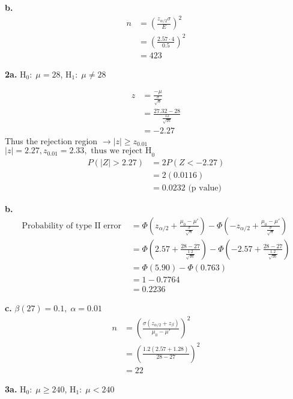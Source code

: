 \documentclass[12pt]{report}
\makeatletter
\newcommand*{\xbar}{}%
\DeclareRobustCommand*{\xbar}{%
	\mathpalette\@xbar{}%
}
\newcommand*{\@xbar}[2]{%
	\sbox0{$#1\mathrm{x}\m@th$}%
	\sbox2{$#1x\m@th$}%
	\rlap{%
		\hbox to\wd2{%
			\hfill
			$\overline{%
				\vrule width 0pt height\ht0 %
				\kern\wd0 %
			}$%
		}%
	}%
	\copy2 %
}
\makeatother
\begin{document}
\noindent \textbf{b.} 
\begin{align*}
	n &= \left(\frac{z_{\alpha/2}\sigma}{E}\right)^2\\
	&= \left(\frac{2.57 \cdot 4}{0.5}\right)^2\\
	&= \boxed{423}
\end{align*}

\noindent \textbf{2a.} H$_0 : \; \mu = 28$, H$_1 : \; \mu \neq 28$

\begin{align*}
	z &= \frac{\xbar - \mu}{\frac{\sigma}{\sqrt{n}}}\\
	&= \frac{27.32 - 28}{\frac{12}{\sqrt{16}}}\\
	&= -2.27
\end{align*} 
Thus the rejection region $ \rightarrow |z| \geq z_{0.01}$\\
$|z| = 2.27, z_{0.01} = 2.33, \boxed{\text{ thus we reject H}_0}$\\

\begin{align*}
	P(|Z| > 2.27) &= 2P(Z < -2.27)\\
	&= 2(0.0116)\\
	&= \boxed{0.0232} \text{ (p value)}
\end{align*}

\pagebreak
\noindent \textbf{b.} 
\begin{align*}
	\text{Probability of type II error } &= \Phi\left(z_{\alpha/2} + \frac{\mu_0 - \mu'}{\frac{\sigma}{\sqrt{n}}}\right)-\Phi\left(-z_{\alpha/2} + \frac{\mu_0 - \mu'}{\frac{\sigma}{\sqrt{n}}}\right)\\
	&= \Phi\left(2.57 + \frac{28 - 27}{\frac{1.2}{\sqrt{16}}}\right)-\Phi\left(-2.57 + \frac{28 - 27}{\frac{1.2}{\sqrt{16}}}\right)\\
	&= \Phi(5.90) - \Phi(0.763)\\
	&= 1 - 0.7764\\
	&= \boxed{0.2236}
\end{align*}

\noindent \textbf{c.} $\beta(27) = 0.1,\;\alpha = 0.01$
\begin{align*}
	n &= \left(\frac{\sigma(z_{\alpha/2} + z_\beta)}{\mu_0 - \mu'}\right)^2\\
	&= \left(\frac{1.2(2.57 + 1.28)}{28 - 27}\right)^2\\
	&= \boxed{22}
\end{align*}

\noindent \textbf{3a.} H$_0 : \; \mu \geq 240$, H$_1 : \; \mu < 240$\\
\end{document}

